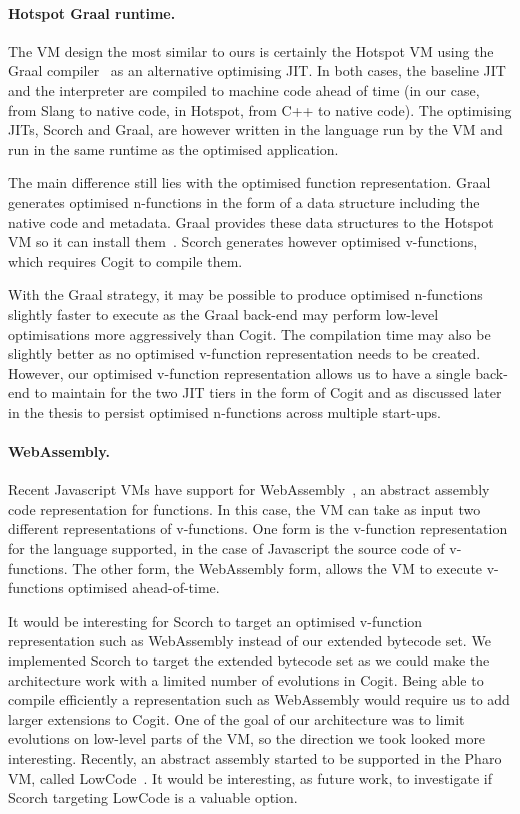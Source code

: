 \documentclass[a4paper,12pt,twoside]{../includes/ThesisStyle}
\begin{document}
\paragraph{Hotspot Graal runtime.}
The VM design the most similar to ours is certainly the Hotspot VM using the Graal compiler~\cite{Oracle13,Dubo13c} as an alternative optimising JIT. In both cases, the baseline JIT and the interpreter are compiled to machine code ahead of time (in our case, from Slang to native code, in Hotspot, from C++ to native code). The optimising JITs, Scorch and Graal, are however written in the language run by the VM and run in the same runtime as the optimised application. 

The main difference still lies with the optimised function representation. Graal generates optimised n-functions in the form of a data structure including the native code and metadata. Graal provides these data structures to the Hotspot VM so it can install them~\cite{Grim13a}. Scorch generates however optimised v-functions, which requires Cogit to compile them. 

With the Graal strategy, it may be possible to produce optimised n-functions slightly faster to execute as the Graal back-end may perform low-level optimisations more aggressively than Cogit. The compilation time may also be slightly better as no optimised v-function representation needs to be created. However, our optimised v-function representation allows us to have a single back-end to maintain for the two JIT tiers in the form of Cogit and as discussed later in the thesis to persist optimised n-functions across multiple start-ups.

\paragraph{WebAssembly.}
Recent Javascript VMs have support for WebAssembly~\cite{WebAssembly}, an abstract assembly code representation for functions. In this case, the VM can take as input two different representations of v-functions. One form is the v-function representation for the language supported, in the case of Javascript the source code of v-functions. The other form, the WebAssembly form, allows the VM to execute v-functions optimised ahead-of-time.

It would be interesting for Scorch to target an optimised v-function representation such as WebAssembly instead of our extended bytecode set. We implemented Scorch to target the extended bytecode set as we could make the architecture work with a limited number of evolutions in Cogit. Being able to compile efficiently a representation such as WebAssembly would require us to add larger extensions to Cogit. One of the goal of our architecture was to limit evolutions on low-level parts of the VM, so the direction we took looked more interesting. Recently, an abstract assembly started to be supported in the Pharo VM, called LowCode~\cite{Salg16a}. It would be interesting, as future work, to investigate if Scorch targeting LowCode is a valuable option.
\end{document}
